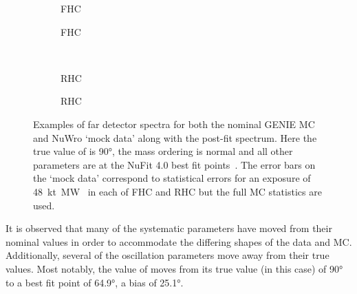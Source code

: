 \begin{figure}[h]
	\begin{subfigure}[t]{0.5\linewidth}
		\begin{adjustbox}{max totalsize=\linewidth, center}
			
		\end{adjustbox}	
		\caption{\numu FHC}	
	\end{subfigure}	
	\hfill
	\begin{subfigure}[t]{0.5\linewidth}
		\begin{adjustbox}{max totalsize=\linewidth, center}
			
		\end{adjustbox}	
		\caption{\nue FHC}	
	\end{subfigure} \\ 
	\begin{subfigure}[t]{0.5\linewidth}
		\begin{adjustbox}{max totalsize=\linewidth, center}
			
		\end{adjustbox}	
		\caption{\numu RHC}	
	\end{subfigure}	
	\hfill
	\begin{subfigure}[t]{0.5\linewidth}
		\begin{adjustbox}{max totalsize=\linewidth, center}
			
		\end{adjustbox}		
		\caption{\nue RHC}
	\end{subfigure}
	\caption[Examples of far detector spectra for both the nominal GENIE MC and NuWro `mock data' along with the post-fit spectrum.]{Examples of far detector spectra for both the nominal GENIE MC and NuWro `mock data' along with the post-fit spectrum. Here the true value of \dcp is \ang{90}, the mass ordering is normal and all other parameters are at the NuFit 4.0 best fit points~\cite{nufit4}. The error bars on the `mock data' correspond to statistical errors for an exposure of \SI{48}{\kilo\tonne\mega\watt\year} in each of FHC and RHC but the full MC statistics are used.}
	\label{fig:fdSamplesPostFit}
\end{figure}

It is observed that many of the systematic parameters have moved from their nominal values in order to accommodate the differing shapes of the data and MC.
Additionally, several of the oscillation parameters move away from their true values.
Most notably, the value of \dcp moves from its true value (in this case) of \ang{90} to a best fit point of \ang{64.9}, a bias of \ang{25.1}.

